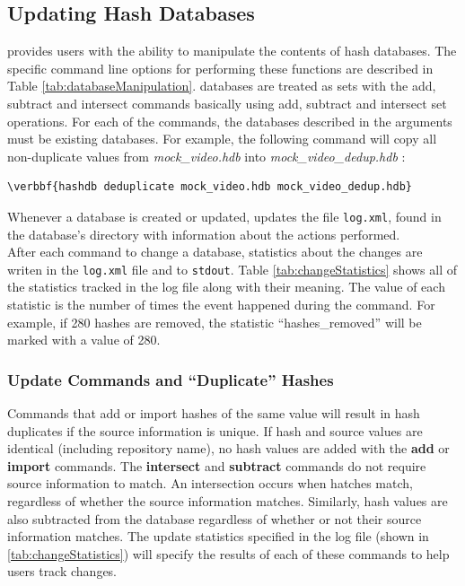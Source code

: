 \documentclass[11pt,fleqn]{article} %
\begin{document}
\subsection{Updating Hash Databases}
\label{updateSection}
\hash provides users with the ability to manipulate the contents of hash databases. The specific command line options for performing these functions are described in Table \ref{tab:databaseManipulation}. \hash databases are treated as sets with the add, subtract and intersect commands basically using add, subtract and intersect set operations. For each of the commands, the databases described in the arguments must be existing databases. For example, the following command will  copy all non-duplicate values from \textit{mock\_video.hdb} into \textit{mock\_video\_dedup.hdb} :
\begin{Verbatim}[commandchars=\\\{\}]
\verbbf{hashdb deduplicate mock_video.hdb mock_video_dedup.hdb}
\end{Verbatim}
Whenever a database is created or updated, \hash updates the file \texttt{log.xml}, found in the database's directory with information about the actions performed.\\

After each command to change a database, statistics about the changes are writen in the \texttt{log.xml} file and to \texttt{stdout}. Table \ref{tab:changeStatistics} shows all of the statistics tracked in the log file along with their meaning. The value of each statistic is the number of times the event happened during the command. For example, if 280 hashes are removed, the statistic ``hashes\_removed'' will be marked with a value of 280. \\

\subsubsection{Update Commands and ``Duplicate'' Hashes}
Commands that add or import hashes of the same value will result in hash duplicates if the source information is unique. If hash and source values are identical (including repository name), no hash values are added with the \textbf{add} or \textbf{import} commands. The \textbf{intersect} and \textbf{subtract} commands do not require source information to match. An intersection occurs when hatches match, regardless of whether the source information matches. Similarly, hash values are also subtracted from the database regardless of whether or not their source information matches.  The update statistics specified in the log file (shown in \ref{tab:changeStatistics}) will specify the results of each of these commands to help users track changes. \\
\end{document}
